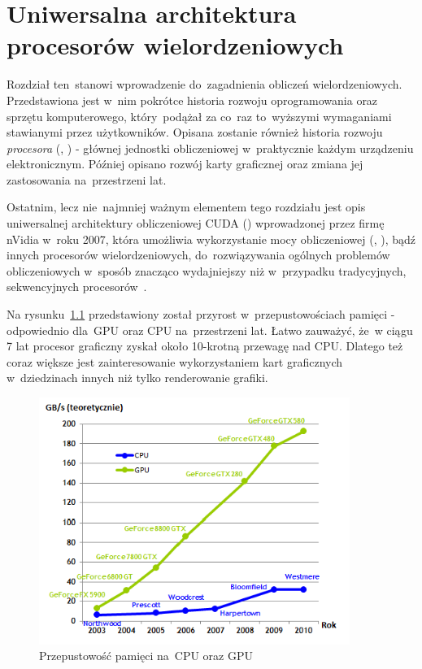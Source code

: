 \chapter{Uniwersalna architektura procesorów wielordzeniowych}\label{chap:cuda}
Rozdział ten~stanowi wprowadzenie do~zagadnienia obliczeń wielordzeniowych. Przedstawiona jest w~nim pokrótce historia rozwoju oprogramowania oraz sprzętu komputerowego, który~podążał za co~raz to~wyższymi wymaganiami stawianymi przez użytkowników. Opisana zostanie również historia rozwoju \emph{procesora} (, ) - głównej jednostki obliczeniowej w~praktycznie każdym urządzeniu elektronicznym. Później opisano rozwój karty graficznej oraz zmiana jej zastosowania na~przestrzeni lat. 

Ostatnim, lecz nie~najmniej ważnym elementem tego rozdziału jest opis uniwersalnej architektury obliczeniowej CUDA () wprowadzonej przez firmę nVidia w~roku 2007, która umożliwia wykorzystanie mocy obliczeniowej  (, ), bądź innych procesorów wielordzeniowych, do~rozwiązywania ogólnych problemów obliczeniowych w~sposób znacząco wydajniejszy niż w~przypadku tradycyjnych, sekwencyjnych procesorów~\cite{cuda:zone}.

Na rysunku~\ref{rys:gpu_cpu} przedstawiony został przyrost w~przepustowościach pamięci - odpowiednio dla~GPU oraz CPU na~przestrzeni lat. Łatwo zauważyć, że~w ciągu 7 lat procesor graficzny zyskał około 10-krotną przewagę nad CPU. Dlatego też coraz większe jest zainteresowanie wykorzystaniem kart graficznych w~dziedzinach innych niż tylko renderowanie grafiki.

\begin{figure}[ht]
\centering\includegraphics[width=0.9\textwidth]{figures/03/gpu_cpu.png}
\caption{Przepustowość pamięci na~CPU oraz GPU~\cite{Cuda:PGuide}}\label{rys:gpu_cpu}
\end{figure}

